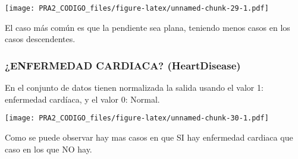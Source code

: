 \documentclass[
]{article}
\newenvironment{Shaded}{\begin{snugshade}}{\end{snugshade}}
\newcommand{\AttributeTok}[1]{\textcolor[rgb]{0.80,0.80,0.80}{#1}}
\newcommand{\ConstantTok}[1]{\textcolor[rgb]{0.86,0.64,0.64}{\textbf{#1}}}
\newcommand{\DecValTok}[1]{\textcolor[rgb]{0.86,0.86,0.80}{#1}}
\newcommand{\FloatTok}[1]{\textcolor[rgb]{0.75,0.75,0.82}{#1}}
\newcommand{\FunctionTok}[1]{\textcolor[rgb]{0.94,0.94,0.56}{#1}}
\newcommand{\NormalTok}[1]{\textcolor[rgb]{0.80,0.80,0.80}{#1}}
\newcommand{\OtherTok}[1]{\textcolor[rgb]{0.94,0.94,0.56}{#1}}
\newcommand{\SpecialCharTok}[1]{\textcolor[rgb]{0.86,0.64,0.64}{#1}}
\newcommand{\StringTok}[1]{\textcolor[rgb]{0.80,0.58,0.58}{#1}}
\begin{document}
\texttt{[image: PRA2\_CODIGO\_files/figure-latex/unnamed-chunk-29-1.pdf]}

El caso más común es que la pendiente sea plana, teniendo menos casos en
los casos descendentes.

\hypertarget{enfermedad-cardiaca-heartdisease}{%
\subsubsection{¿ENFERMEDAD CARDIACA?
(HeartDisease)}\label{enfermedad-cardiaca-heartdisease}}

En el conjunto de datos tienen normalizada la salida usando el valor 1:
enfermedad cardíaca, y el valor 0: Normal.

\begin{Shaded}
\end{Shaded}

\texttt{[image: PRA2\_CODIGO\_files/figure-latex/unnamed-chunk-30-1.pdf]}

Como se puede observar hay mas casos en que SI hay enfermedad cardiaca
que caso en los que NO hay.
\end{document}

